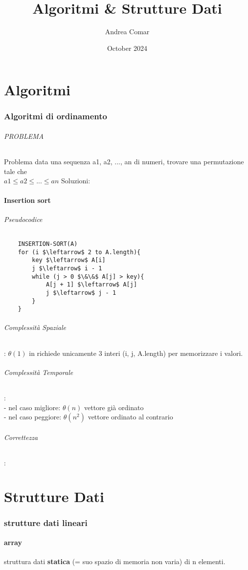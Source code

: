 \documentclass{article}
\title{Algoritmi \& Strutture Dati}
\author{Andrea Comar}
\date{October 2024}
\begin{document}
\maketitle
\newpage
\tableofcontents
\newpage
\part{Algoritmi}
\section{Algoritmi di ordinamento}
\paragraph{PROBLEMA} Problema data una sequenza a1, a2, ..., an di numeri,
trovare una permutazione tale che \\
$a1 \leq a2  \leq ... \leq an$
Soluzioni:
\subsection{Insertion sort} 
 \paragraph{Pseudocodice}
    \begin{lstlisting}
    INSERTION-SORT(A)
    for (i $\leftarrow$ 2 to A.length){
        key $\leftarrow$ A[i]
        j $\leftarrow$ i - 1
        while (j > 0 $\&\&$ A[j] > key){
            A[j + 1] $\leftarrow$ A[j]
            j $\leftarrow$ j - 1
        }
    }
    \end{lstlisting}
\paragraph{Complessità Spaziale}: $\theta(1)$ in richiede unicamente 3 interi (i, j, A.length) 
per memorizzare i valori.

\paragraph{Complessità Temporale}: \\
- nel caso migliore: $\theta(n)$ vettore già ordinato\\
- nel caso peggiore: $\theta(n^2)$ vettore ordinato al contrario\\

\paragraph{Correttezza}: \\

\part{Strutture Dati}
\section{strutture dati lineari}
\subsection{array}
struttura dati \textbf{statica} (= suo spazio di memoria non varia) di n elementi.\\
\end{document}
